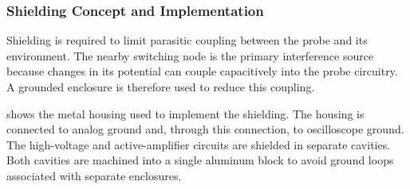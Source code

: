 \subsubsection*{Shielding Concept and Implementation}

Shielding is required to limit parasitic coupling between the probe and its environment.
The nearby switching node is the primary interference source because changes in its potential can couple capacitively into the probe circuitry.
A grounded enclosure is therefore used to reduce this coupling.

 shows the metal housing used to implement the shielding.
The housing is connected to analog ground and, through this connection, to oscilloscope ground.
The high-voltage and active-amplifier circuits are shielded in separate cavities.
Both cavities are machined into a single aluminum block to avoid ground loops associated with separate enclosures.


